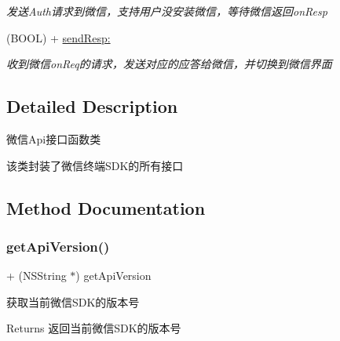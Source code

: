 \begin{DoxyCompactItemize}
\begin{DoxyCompactList}\small\item\em 发送\+Auth请求到微信，支持用户没安装微信，等待微信返回on\+Resp \end{DoxyCompactList}\item 
(B\+O\+OL) + \mbox{\hyperlink{interface_w_x_api_ab026294e5601cd15d7b792c3de7b81d5}{send\+Resp\+:}}
\begin{DoxyCompactList}\small\item\em 收到微信on\+Req的请求，发送对应的应答给微信，并切换到微信界面 \end{DoxyCompactList}\end{DoxyCompactItemize}


\subsection{Detailed Description}
微信\+Api接口函数类 

该类封装了微信终端\+S\+D\+K的所有接口 

\subsection{Method Documentation}
\mbox{\label{interface_w_x_api_a5995d42d92822722f7ebf11663db2d33}} 
\subsubsection{\texorpdfstring{get\+Api\+Version()}{getApiVersion()}\hspace{0.1cm}{\footnotesize\ttfamily [1/3]}}
{\footnotesize\ttfamily + (N\+S\+String $\ast$) get\+Api\+Version \begin{DoxyParamCaption}{ }\end{DoxyParamCaption}}



获取当前微信\+S\+D\+K的版本号 

\begin{DoxyReturn}{Returns}
返回当前微信\+S\+D\+K的版本号 
\end{DoxyReturn}
\mbox{\label{interface_w_x_api_a5995d42d92822722f7ebf11663db2d33}} 

